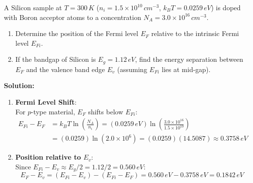 \begin{example}
A Silicon sample at $T = 300\,\si{K}$ ($n_i = 1.5 \times 10^{10}\,\si{cm^{-3}}$, $k_B T = 0.0259\,\si{eV}$) is doped with Boron acceptor atoms to a concentration $N_A = 3.0 \times 10^{16}\,\si{cm^{-3}}$.
\begin{enumerate}
    \item Determine the position of the Fermi level $E_F$ relative to the intrinsic Fermi level $E_{Fi}$.
    \item If the bandgap of Silicon is $E_g = 1.12\,\si{eV}$, find the energy separation between $E_F$ and the valence band edge $E_v$ (assuming $E_{Fi}$ lies at mid-gap).
\end{enumerate}

\textbf{Solution:}
\begin{enumerate}
    \item \textbf{Fermi Level Shift}:\\
    For $p$-type material, $E_F$ shifts below $E_{Fi}$:
    \begin{align*}
        E_{Fi} - E_F &= k_B T \ln\left(\frac{N_A}{n_i}\right) = (0.0259\,\si{eV})\ln\left(\frac{3.0 \times 10^{16}}{1.5 \times 10^{10}}\right) \\
        &= (0.0259)\ln(2.0 \times 10^6) = (0.0259)(14.5087) \approx 0.3758\,\si{eV}
    \end{align*}
    
    \item \textbf{Position relative to $E_v$}:\\
    Since $E_{Fi} - E_v \approx E_g / 2 = 1.12 / 2 = 0.560\,\si{eV}$:
    \begin{equation*}
        E_F - E_v = (E_{Fi} - E_v) - (E_{Fi} - E_F) = 0.560\,\si{eV} - 0.3758\,\si{eV} = 0.1842\,\si{eV}
    \end{equation*}
\end{enumerate}
\end{example}

